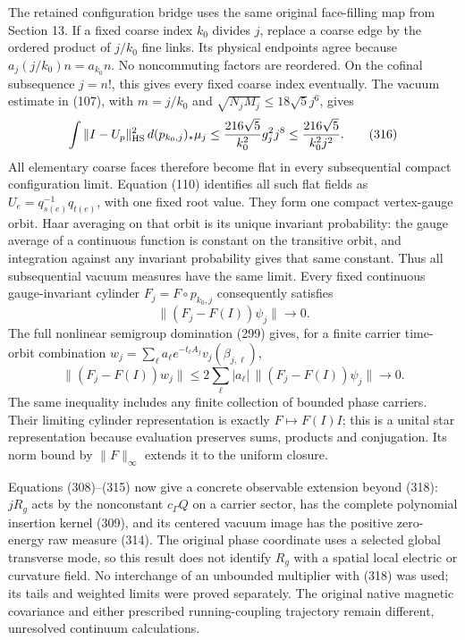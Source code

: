 \documentclass[
  11pt,
]{article}
\begin{document}
The retained configuration bridge uses the same original face-filling
map from Section 13. If a fixed coarse index \(k_0\) divides \(j\),
replace a coarse edge by the ordered product of \(j/k_0\) fine links.
Its physical endpoints agree because \(a_j(j/k_0)n=a_{k_0}n\). No
noncommuting factors are reordered. On the cofinal subsequence \(j=n!\),
this gives every fixed coarse index eventually. The vacuum estimate in
(107), with \(m=j/k_0\) and \(\sqrt{N_jM_j}\le18\sqrt5j^6\), gives \[
\int\|I-U_p\|_{\rm HS}^2\,d(p_{k_0,j})_*\mu_j
\le\frac{216\sqrt5}{k_0^2}g_j^2j^8
\le\frac{216\sqrt5}{k_0^2j^2}.
\tag{316}
\] All elementary coarse faces therefore become flat in every
subsequential compact configuration limit. Equation (110) identifies all
such flat fields as \(U_e=q_{s(e)}^{-1}q_{t(e)}\), with one fixed root
value. They form one compact vertex-gauge orbit. Haar averaging on that
orbit is its unique invariant probability: the gauge average of a
continuous function is constant on the transitive orbit, and integration
against any invariant probability gives that same constant. Thus all
subsequential vacuum measures have the same limit. Every fixed
continuous gauge-invariant cylinder \(F_j=F\circ p_{k_0,j}\)
consequently satisfies \[
\|(F_j-F(I))\psi_j\|\longrightarrow0 .
\tag{317}
\] The full nonlinear semigroup domination (299) gives, for a finite
carrier time-orbit combination
\(w_j=\sum_\ell a_\ell e^{-t_\ell A_j}v_j(\beta_{j,\ell})\), \[
\|(F_j-F(I))w_j\|
\le2\sum_\ell|a_\ell|\,\|(F_j-F(I))\psi_j\|
\longrightarrow0 .
\tag{318}
\] The same inequality includes any finite collection of bounded phase
carriers. Their limiting cylinder representation is exactly
\(F\mapsto F(I)I\); this is a unital star representation because
evaluation preserves sums, products and conjugation. Its norm bound by
\(\|F\|_\infty\) extends it to the uniform closure.

Equations (308)--(315) now give a concrete observable extension beyond
(318): \(jR_g\) acts by the nonconstant \(c_\Gamma Q\) on a carrier
sector, has the complete polynomial insertion kernel (309), and its
centered vacuum image has the positive zero-energy raw measure (314).
The original phase coordinate uses a selected global transverse mode, so
this result does not identify \(R_g\) with a spatial local electric or
curvature field. No interchange of an unbounded multiplier with (318)
was used; its tails and weighted limits were proved separately. The
original native magnetic covariance and either prescribed
running-coupling trajectory remain different, unresolved continuum
calculations.
\end{document}
